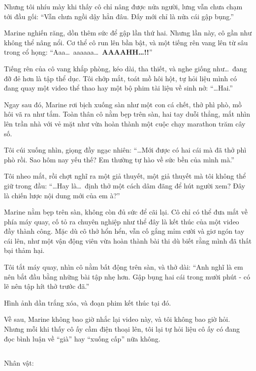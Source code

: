 \documentclass[../main.tex]{subfiles}
\begin{document}
Nhưng tôi nhíu mày khi thấy cô chỉ nâng được nửa người, lưng vẫn chưa chạm tới đầu gối: ``Vẫn chưa ngồi dậy hẳn đâu. Đấy mới chỉ là nửa cái gập bụng.''


Marine nghiến răng, dồn thêm sức để gập lần thứ hai. Nhưng lần này, cô gần như không thể nâng nổi. Cơ thể cô run lên bần bật, và một tiếng rên vang lên từ sâu trong cổ họng: ``Aaa\dots\ aaaaaa\dots\ \textbf{AAAAHH\dots!!}''

Tiếng rên của cô vang khắp phòng, kéo dài, tha thiết, và nghe giống như\dots\ đang đỡ đẻ hơn là tập thể dục. Tôi chớp mắt, toát mồ hôi hột, tự hỏi liệu mình có đang quay một video thể thao hay một bộ phim tài liệu về sinh nở: ``\dots  Hai.''

Ngay sau đó, Marine rơi bịch xuống sàn như một con cá chết, thở phì phò, mồ hôi vã ra như tắm. Toàn thân cô nằm bẹp trên sàn, hai tay duỗi thẳng, mắt nhìn lên trần nhà với vẻ mặt như vừa hoàn thành một cuộc chạy marathon trăm cây số.

Tôi cúi xuống nhìn, giọng đầy ngạc nhiên: ``\dots  Mới được có hai cái mà đã thở phì phò rồi. Sao hôm nay yếu thế? Em thường tự hào về sức bền của mình mà.''

Tôi nheo mắt, rồi chợt nghĩ ra một giả thuyết, một giả thuyết mà tôi không thể giữ trong đầu: ``\dots  Hay là\dots\ định thở một cách dâm đãng để hút người xem? Đây là chiến lược nội dung mới của em à?''


Marine nằm bẹp trên sàn, không còn đủ sức để cãi lại. Cô chỉ có thể đưa mắt về phía máy quay, cố tỏ ra chuyên nghiệp như thể đây là kết thúc của một video đầy thành công. Mặc dù cô thở hổn hển, vẫn cố gắng mỉm cười và giơ ngón tay cái lên, như một vận động viên vừa hoàn thành bài thi dù biết rằng mình đã thất bại thảm hại.

Tôi tắt máy quay, nhìn cô nằm bất động trên sàn, và thở dài: ``Anh nghĩ là em nên bắt đầu bằng những bài tập nhẹ hơn. Gập bụng hai cái trong mười phút - có lẽ nên tập hít thở trước đã.''

Hình ảnh dần trắng xóa, và đoạn phim kết thúc tại đó.

Về sau, Marine không bao giờ nhắc lại video này, và tôi không bao giờ hỏi. Nhưng mỗi khi thấy cô ấy cầm điện thoại lên, tôi lại tự hỏi liệu cô ấy có đang đọc bình luận về ``già'' hay ``xuống cấp'' nữa không.

\subsection*{\label{ep-S16.VII}}
\vspace{-4pt}
\begin{center}
    {\caviar\fontsize{12pt}{12pt}\selectfont Nhân vật:  }
\end{center}
\end{document}
